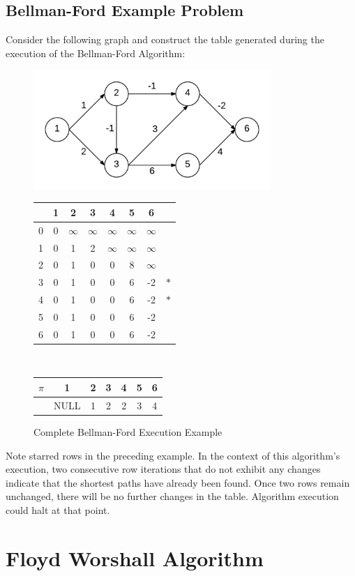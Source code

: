 \documentclass[12pt,letterpaper]{article}
\begin{document}
\subsection{Bellman-Ford Example Problem}
Consider the following graph and construct the table generated during the execution of the Bellman-Ford Algorithm:
\begin{figure}[h]
\centering
\includegraphics[width=9cm]{bfex2}\\
\begin{tabular}{|c|c|c|c|c|c|c|c|}
\hline
 &1&2&3&4&5&6& \\ \hline \hline
0&0&$\infty$&$\infty$&$\infty$&$\infty$&$\infty$& \\ \hline
1&0&1&2&$\infty$&$\infty$&$\infty$& \\ \hline
2&0&1&0&0&8&$\infty$& \\ \hline
3&0&1&0&0&6&-2&$\ast$\\ \hline
4&0&1&0&0&6&-2&$\ast$\\ \hline
5&0&1&0&0&6&-2& \\ \hline
6&0&1&0&0&6&-2& \\ \hline
\end{tabular}\\
\vspace{.5cm}
\begin{tabular}{|c|c|c|c|c|c|c|}
\hline
$\pi$&1&2&3&4&5&6 \\ \hline
 &NULL&1&2&2&3&4\\ \hline
\end{tabular}
\caption{Complete Bellman-Ford Execution Example}
\end{figure}
\FloatBarrier
Note starred rows in the preceding example. In the context of this algorithm's execution, two consecutive row iterations that do not exhibit any changes indicate that the shortest paths have already been found. Once two rows remain unchanged, there will be no further changes in the table. Algorithm execution could halt at that point.
\section{Floyd Worshall Algorithm}
\end{document}
